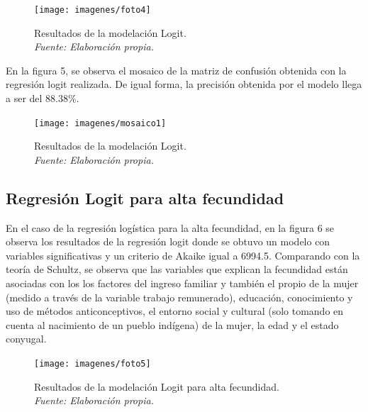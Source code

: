 \documentclass[Royal,times,sageh]{sagej}
\begin{document}
\begin{figure}

{\centering \texttt{[image: imagenes/foto4]} 

}

\caption{Resultados de la modelación Logit.\\\textit{Fuente: Elaboración propia.}}\label{fig:unnamed-chunk-4}
\end{figure}

En la figura 5, se observa el mosaico de la matriz de confusión obtenida
con la regresión logit realizada. De igual forma, la precisión obtenida
por el modelo llega a ser del 88.38\%.

\begin{figure}

{\centering \texttt{[image: imagenes/mosaico1]} 

}

\caption{Resultados de la modelación Logit.\\\textit{Fuente: Elaboración propia.}}\label{fig:unnamed-chunk-5}
\end{figure}

\subsection{Regresión Logit para alta
fecundidad}\label{regresiuxf3n-logit-para-alta-fecundidad}

En el caso de la regresión logística para la alta fecundidad, en la
figura 6 se observa los resultados de la regresión logit donde se obtuvo
un modelo con variables significativas y un criterio de Akaike igual a
6994.5. Comparando con la teoría de Schultz, se observa que las
variables que explican la fecundidad están asociadas con los los
factores del ingreso familiar y también el propio de la mujer (medido a
través de la variable trabajo remunerado), educación, conocimiento y uso
de métodos anticonceptivos, el entorno social y cultural (solo tomando
en cuenta al nacimiento de un pueblo indígena) de la mujer, la edad y el
estado conyugal.

\begin{figure}

{\centering \texttt{[image: imagenes/foto5]} 

}

\caption{Resultados de la modelación Logit para alta fecundidad.\\\textit{Fuente: Elaboración propia.}}\label{fig:unnamed-chunk-6}
\end{figure}
\end{document}
